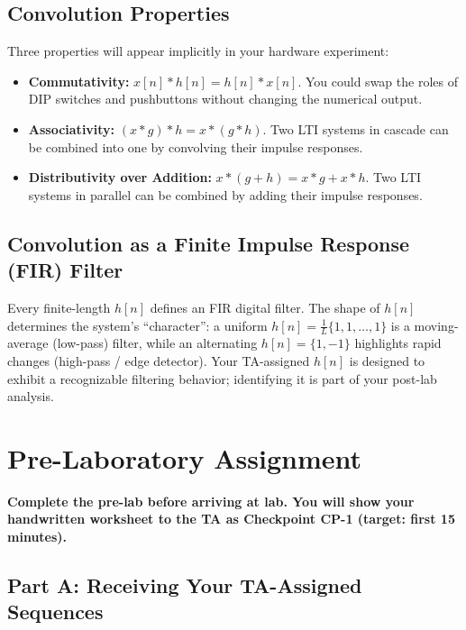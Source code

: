 \documentclass[11pt,letterpaper]{article}
\begin{document}
\subsection{Convolution Properties}

Three properties will appear implicitly in your hardware experiment:
\begin{itemize}
    \item \textbf{Commutativity:} $x[n] * h[n] = h[n] * x[n]$. You could swap the roles of DIP switches and pushbuttons without changing the numerical output.
    \item \textbf{Associativity:} $(x * g) * h = x * (g * h)$. Two LTI systems in cascade can be combined into one by convolving their impulse responses.
    \item \textbf{Distributivity over Addition:} $x * (g + h) = x * g + x * h$. Two LTI systems in parallel can be combined by adding their impulse responses.
\end{itemize}

\subsection{Convolution as a Finite Impulse Response (FIR) Filter}

Every finite-length $h[n]$ defines an FIR digital filter. The shape of $h[n]$ determines the system's ``character'': a uniform $h[n] = \frac{1}{L}\{1, 1, \ldots, 1\}$ is a moving-average (low-pass) filter, while an alternating $h[n] = \{1, -1\}$ highlights rapid changes (high-pass / edge detector). Your TA-assigned $h[n]$ is designed to exhibit a recognizable filtering behavior; identifying it is part of your post-lab analysis.

\clearpage

\section{Pre-Laboratory Assignment}

\textbf{Complete the pre-lab before arriving at lab. You will show your handwritten worksheet to the TA as Checkpoint CP-1 (target: first 15 minutes).}

\subsection{Part A: Receiving Your TA-Assigned Sequences}
\end{document}
